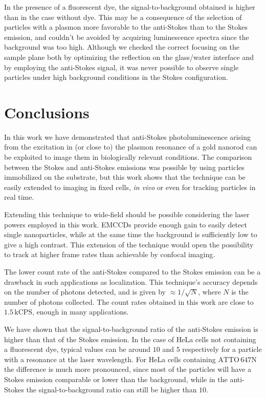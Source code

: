 \documentclass[journal=nalefd,manuscript=letter]{achemso}
\newcommand{\kCPS}{\ensuremath{\,\textrm{kCPS}}}
\newcommand{\atto}{\ensuremath{\textrm{ATTO}\,647\textrm{N}}}
\begin{document}
In the presence of a fluorescent dye, the signal-to-background obtained is
higher than in the case without dye. This may be a consequence of the selection
of particles with a plasmon more favorable to the anti-Stokes than to the Stokes
emission, and couldn't be avoided by acquiring luminescence spectra since the
background was too high. Although we checked the correct focusing on the sample
plane both by optimizing the reflection on the glass/water interface and by
employing the anti-Stokes signal, it was never possible to observe single
particles under high background conditions in the Stokes configuration.

\section{Conclusions}
In this work we have demonstrated that anti-Stokes photoluminescence arising
from the excitation in (or close to) the plasmon resonance of a gold nanorod can be
exploited to image them in biologically relevant conditions\cite{Jiang2013}. The
comparison between the Stokes and anti-Stokes emissions was possible by using
particles immobilized on the substrate, but this work shows that the technique
can be easily extended to imaging in fixed cells, \textit{in vivo} or even for
tracking particles in real time\cite{VandenBroek2013}.

Extending this technique to wide-field should be possible considering the laser
powers employed in this work. EMCCDs provide enough gain\cite{Dussault2004} to
easily detect single nanoparticles, while at the same time the background is
sufficiently low to give a high contrast. This extension of the technique would
open the possibility to track at higher frame rates than achievable by
confocal imaging.

The lower count rate of the anti-Stokes compared to the Stokes emission can be a
drawback in such applications as localization\cite{Sahl2013}. This technique's
accuracy depends on the number of photons detected, and is given by $\approx
1/\sqrt{N}$, where $N$ is the number of photons collected. The count rates
obtained in this work are close to $1.5\kCPS$, enough in many applications.

We have shown that the signal-to-background ratio of the anti-Stokes emission is
higher than that of the Stokes emission. In the case of HeLa cells not containing a
fluorescent dye, typical values can be around $10$ and $5$ respectively for a
particle with a resonance at the laser wavelength. For HeLa cells containing
$\atto$ the difference is much more pronounced, since most of the particles will
have a Stokes emission comparable or lower than the background, while in the anti-Stokes the
signal-to-background ratio can still be higher than $10$.
\end{document}

